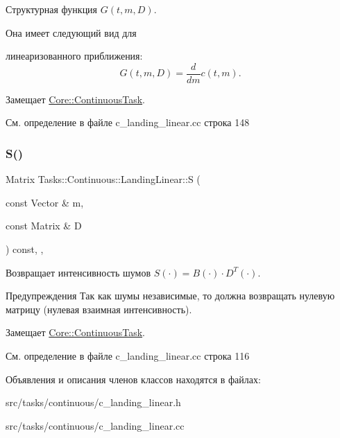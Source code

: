 Структурная функция $G(t, m, D)$. 

Она имеет следующий вид для


\begin{DoxyItemize}
\item линеаризованного приближения\+: \[G(t, m, D) = \frac{d}{dm} c(t, m).\] 
\end{DoxyItemize}

Замещает \hyperlink{class_core_1_1_continuous_task_a1b579e183ffa229f97048aadfd834517}{Core\+::\+Continuous\+Task}.



См. определение в файле c\+\_\+landing\+\_\+linear.\+cc строка 148

\hypertarget{class_tasks_1_1_continuous_1_1_landing_linear_a886bc6dd08e4355ab0c491d48f9de002}{}\label{class_tasks_1_1_continuous_1_1_landing_linear_a886bc6dd08e4355ab0c491d48f9de002} 
\subsubsection{\texorpdfstring{S()}{S()}}
{\footnotesize\ttfamily Matrix Tasks\+::\+Continuous\+::\+Landing\+Linear\+::S (\begin{DoxyParamCaption}\item[{const Vector \&}]{m,  }\item[{const Matrix \&}]{D }\end{DoxyParamCaption}) const\hspace{0.3cm}{\ttfamily [override]}, {\ttfamily [protected]}, {\ttfamily [virtual]}}



Возвращает интенсивность шумов $S(\cdot) = B(\cdot) \cdot D^T(\cdot)$. 

\begin{DoxyWarning}{Предупреждения}
Так как шумы независимые, то должна возвращать нулевую матрицу (нулевая взаимная интенсивность). 
\end{DoxyWarning}


Замещает \hyperlink{class_core_1_1_continuous_task_aa6d652b655628586aeeda03348f633c5}{Core\+::\+Continuous\+Task}.



См. определение в файле c\+\_\+landing\+\_\+linear.\+cc строка 116



Объявления и описания членов классов находятся в файлах\+:\begin{DoxyCompactItemize}
\item 
src/tasks/continuous/c\+\_\+landing\+\_\+linear.\+h\item 
src/tasks/continuous/c\+\_\+landing\+\_\+linear.\+cc\end{DoxyCompactItemize}

